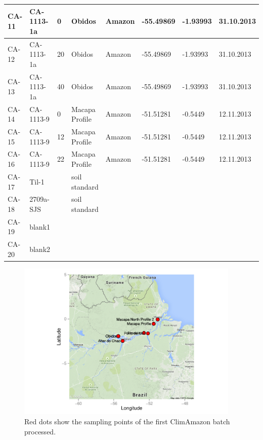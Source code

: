 \begin{table}[h]
\begin{tabular}{|l|l|l|l|l|l|l|l|}
CA-11   & CA-1113-1a           & 0     & Obidos                 & Amazon  & -55.49869    & -1.93993     & 31.10.2013    \\ \hline
CA-12   & CA-1113-1a           & 20    & Obidos                 & Amazon  & -55.49869    & -1.93993     & 31.10.2013    \\ \hline
CA-13   & CA-1113-1a           & 40    & Obidos                 & Amazon  & -55.49869    & -1.93993     & 31.10.2013    \\ \hline
CA-14   & CA-1113-9            & 0     & Macapa Profile         & Amazon  & -51.51281    & -0.5449      & 12.11.2013    \\ \hline
CA-15   & CA-1113-9            & 12    & Macapa Profile         & Amazon  & -51.51281    & -0.5449      & 12.11.2013    \\ \hline
CA-16   & CA-1113-9            & 22    & Macapa Profile         & Amazon  & -51.51281    & -0.5449      & 12.11.2013    \\ \hline
CA-17   & Til-1                &       & soil standard          &         &              &              &               \\ \hline
CA-18   & 2709a-SJS            &       & soil standard          &         &              &              &               \\ \hline
CA-19   & blank1               &       &                        &         &              &              &               \\ \hline
CA-20   & blank2               &       &                        &         &              &              &               \\ \hline
\end{tabular}
\end{table}

\begin{figure}[htbp]
	\centering
	\includegraphics[width=0.95\textwidth]{figures/climAmazoneMap.pdf}
	\caption{Red dots show the sampling points of the first ClimAmazon batch processed.}
	\label{fig:climAmazonSampleMap}
\end{figure}